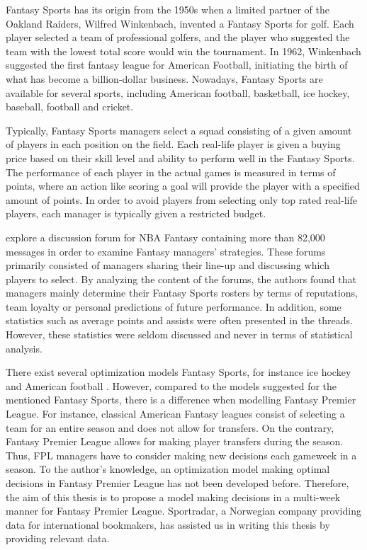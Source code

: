 \newpar

Fantasy Sports has its origin from the 1950s when a limited partner of the Oakland Raiders, Wilfred Winkenbach, invented a Fantasy Sports for golf. Each player selected a team of professional golfers, and the player who suggested the team with the lowest total score would win the tournament. In 1962, Winkenbach suggested the first fantasy league for American Football, initiating the birth of what has become a billion-dollar business. Nowadays, Fantasy Sports are available for several sports, including American football, basketball, ice hockey, baseball, football and cricket.  

\newpar

Typically, Fantasy Sports managers select a squad consisting of a given amount of players in each position on the field. Each real-life player is given a buying price based on their skill level and ability to perform well in the Fantasy Sports. The performance of each player in the actual games is measured in terms of points, where an action like scoring a goal will provide the player with a specified amount of points. In order to avoid players from selecting only top rated real-life players, each manager is typically given a restricted budget.

\newpar

 \cite{Smith} explore a discussion forum for NBA Fantasy containing more than 82,000 messages in order to examine Fantasy managers' strategies. These forums primarily consisted of managers sharing their line-up and discussing which players to select. By analyzing the content of the forums, the authors found that managers mainly determine their Fantasy Sports rosters by terms of reputations, team loyalty or personal predictions of future performance. In addition, some statistics such as average points and assists were often presented in the threads. However, these statistics were seldom discussed and never in terms of statistical analysis. 

\newpar

There exist several optimization models Fantasy Sports, for instance ice hockey \citep{drafting_hockey_pools} and American football \citep{Fry}. However, compared to the models suggested for the mentioned Fantasy Sports, there is a difference when modelling Fantasy Premier League. For instance, classical American Fantasy leagues consist of selecting a team for an entire season and does not allow for transfers. On the contrary, Fantasy Premier League allows for making player transfers during the season. Thus, FPL managers have to consider making new decisions each gameweek in a season. To the author's knowledge, an optimization model making optimal decisions in Fantasy Premier League has not been developed before. Therefore, the aim of this thesis is to propose a model making decisions in a multi-week manner for Fantasy Premier League. Sportradar, a Norwegian company providing data for international bookmakers, has assisted us in writing this thesis by providing relevant data.



